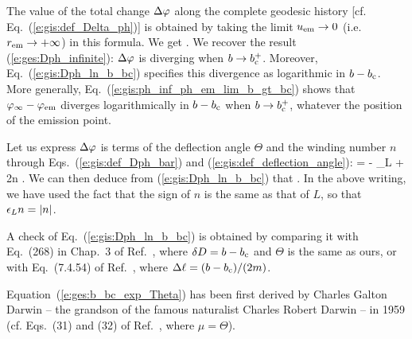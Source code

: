 The value of the total change $\Delta\varphi$ along the complete geodesic history
[cf. Eq.~(\ref{e:gis:def_Delta_ph})]
is obtained by taking the limit $u_{\rm em}\to 0$ (i.e. $r_{\rm em} \to +\infty$)
in this formula. We get
\be \label{e:gis:Dph_ln_b_bc}
    .
\ee
We recover the result (\ref{e:ges:Dph_infinite}): $\Delta\varphi$ is diverging
when $b\to b_{\rm c}^+$. Moreover, Eq.~(\ref{e:gis:Dph_ln_b_bc}) specifies
this divergence as logarithmic in $b - b_{\rm c}$. More generally,
Eq.~(\ref{e:gis:ph_inf_ph_em_lim_b_gt_bc}) shows that $\varphi_\infty - \varphi_{\rm em}$
diverges logarithmically in $b - b_{\rm c}$ when $b\to b_{\rm c}^+$, whatever the position
of the emission point.

Let us express $\Delta\varphi$ is terms of the deflection angle $\Theta$ and
the winding number $n$ through Eqs.~(\ref{e:gis:def_Dph_bar}) and
(\ref{e:gis:def_deflection_angle}):
\be
    \Delta\ph = \Theta - \eps_L \pi + 2\pi n .
\ee
We can then deduce from (\ref{e:gis:Dph_ln_b_bc}) that
\be \label{e:ges:b_bc_exp_Theta}
   .
\ee
In the above writing, we have used the fact that the sign of $n$ is the same
as that of $L$, so that $\epsilon_L n = |n|$.
\begin{remark}
A check of Eq.~(\ref{e:gis:Dph_ln_b_bc}) is obtained by comparing it with
Eq.~(268) in Chap.~3 of Ref.~\cite{Chand83}, where $\delta D = b-b_{\rm c}$ and
$\Theta$ is the same as ours, or with Eq.~(7.4.54) of Ref.~\cite{FroloZ11},
where $\Delta\ell = (b - b_{\rm c})/(2 m)$.
\end{remark}

\begin{hist}
Equation~(\ref{e:ges:b_bc_exp_Theta}) has been first derived by
Charles Galton Darwin -- the grandson of the famous naturalist Charles Robert Darwin -- in 1959 \cite{Darwi59} (cf. Eqs.~(31) and (32) of Ref.~\cite{Darwi59}, where $\mu = \Theta$).
\end{hist}

